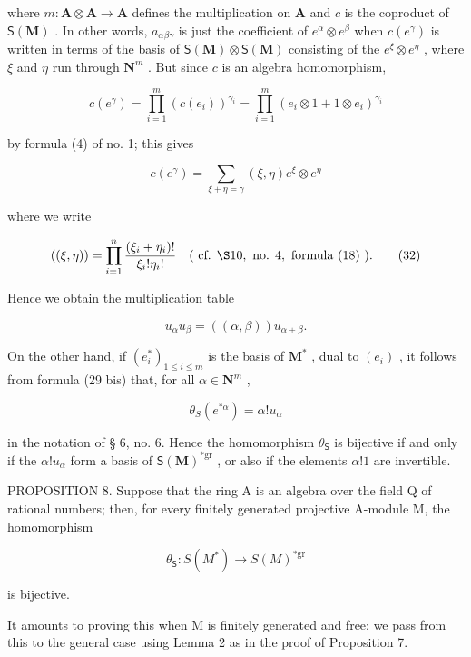 where \(m: \mathbf{A} \otimes \mathbf{A} \to \mathbf{A}\) defines the multiplication on \(\mathbf{A}\) and \(c\) is the coproduct of \(\mathsf{S}(\mathbf{M})\) . In other words, \(a_{\alpha \beta \gamma}\) is just the coefficient of \(e^{\alpha} \otimes e^{\beta}\) when \(c(e^{\gamma})\) is written in terms of the basis of \(\mathsf{S}(\mathbf{M})\otimes \mathsf{S}(\mathbf{M})\) consisting of the \(e^{\xi}\otimes e^{\eta}\) , where \(\xi\) and \(\eta\) run through \(\mathbf{N}^m\) . But since \(c\) is an algebra homomorphism,

\[
c (e ^ {\gamma}) = \prod_ {i = 1} ^ {m} (c (e _ {i})) ^ {\gamma_ {i}} = \prod_ {i = 1} ^ {m} (e _ {i} \otimes 1 + 1 \otimes e _ {i}) ^ {\gamma_ {i}}
\]

by formula (4) of no. 1; this gives

\[
c (e ^ {\gamma}) = \sum_ {\xi + \eta = \gamma} (\xi , \eta) e ^ {\xi} \otimes e ^ {\eta}\tag{31}
\]

where we write

\[
((\xi , \eta)) = \prod_ {i = 1} ^ {n} \frac {(\xi_ {i} + \eta_ {i}) !}{\xi_ {i} ! \eta_ {i} !} \quad (\text { cf.   } \S 10, \text {   no.   } 4, \text {   formula   (18) }).\tag{32}
\]

Hence we obtain the multiplication table

\[
u _ {\alpha} u _ {\beta} = ((\alpha , \beta)) u _ {\alpha + \beta}.\tag{33}
\]

On the other hand, if \((e_i^*)_{1\leq i\leq m}\) is the basis of \(\mathbf{M}^*\) , dual to \((e_i)\) , it follows from formula (29 bis) that, for all \(\alpha \in \mathbf{N}^m\) ,

\[
\theta_ {S} (e ^ {* \alpha}) = \alpha ! u _ {\alpha}\tag{34}
\]

in the notation of § 6, no. 6. Hence the homomorphism \(\theta_{\mathsf{S}}\) is bijective if and only if the \(\alpha!u_{\alpha}\) form a basis of \(\mathsf{S}(\mathbf{M})^{*\mathrm{gr}}\) , or also if the elements \(\alpha!1\) are invertible.

PROPOSITION 8. Suppose that the ring A is an algebra over the field Q of rational numbers; then, for every finitely generated projective A-module M, the homomorphism

\[
\theta_ {\mathsf {S}}: S (M ^ {*}) \rightarrow S (M) ^ {* \mathrm{gr}}
\]

is bijective.

It amounts to proving this when M is finitely generated and free; we pass from this to the general case using Lemma 2 as in the proof of Proposition 7.

